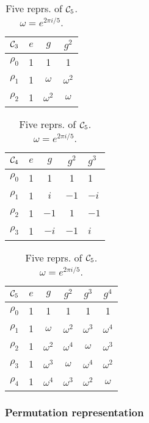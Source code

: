 \begin{table}[hbt!]
	\parbox[s]{.31\linewidth}{
		\centering
		\begin{tabular}{c | c c c}
			$\Cyc_3$ & $e$ & $g$        & $g^2$      \\ \hline
			$\rho_0$          & 1   & 1          & 1          \\
			$\rho_1$          & 1   & $\omega$   & $\omega^2$ \\
			$\rho_2$          & 1   & $\omega^2$ & $\omega$
		\end{tabular}
		\vfill
		\caption{Three reprs. of $\Cyc_3$. $\omega = e^{2 \pi i/3}$.}
		\label{table:Cyc3}
	}
	\hfill
	\parbox[s]{.31\linewidth}{
		\centering
		\begin{tabular}{c | c c cl}
			$\Cyc_4$ & $e$ & $g$  & $g^2$ & $g^3$ \\ \hline
			$\rho_0$           & 1   & 1    & 1     & 1     \\
			$\rho_1$           & 1   & $i$  & $-1$  & $-i$  \\
			$\rho_2$           & 1   & $-1$ & $1$  & $-1$   \\
			$\rho_3$           & 1   & $-i$ & $-1$   & $i$
		\end{tabular}
		\caption{Four reprs. of $\Cyc_4$.}
		\label{tbl:cyc4}
	}
	\hfill
	\parbox[s]{.31\linewidth}{
		\centering
		\begin{tabular}{c | c c c c c}
			$\mathcal{C}_5$ & $e$ & $g$        & $g^2$      & $g^3$      & $g^4$      \\ \hline
			$\rho_0$            & 1   & 1          & 1          & 1          & 1          \\
			$\rho_1$            & 1   & $\omega$ & $\omega^2$ & $\omega^3$ & $\omega^4$ \\
			$\rho_2$            & 1   & $\omega^2$ & $\omega^4$ & $\omega$ & $\omega^3$ \\
			$\rho_3$            & 1   & $\omega^3$ & $\omega$ & $\omega^4$ & $\omega^2$ \\
			$\rho_4$            & 1   & $\omega^4$ & $\omega^3$ & $\omega^2$ & $\omega$
		\end{tabular}
		\caption{Five reprs. of $\mathcal{C}_5$. $\omega = e^{2 \pi i/5}$.}
		\label{table:Cyc5}
	}
\end{table}



\subsubsection{Permutation representation}

